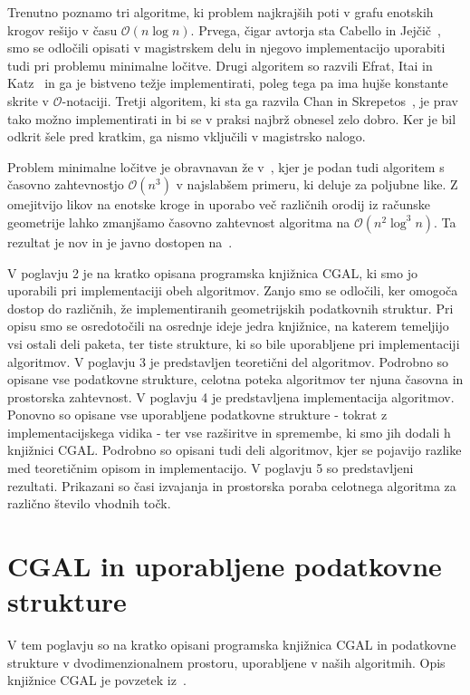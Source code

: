 \documentclass[a4paper, 12pt]{book}
\newcommand{\OO}{\ensuremath{\mathcal{O}}} %
\newcommand{\clearemptydoublepage}{\newpage{\pagestyle{empty}\cleardoublepage}}
\begin{document}
Trenutno poznamo tri algoritme, ki problem najkrajših poti v grafu enotskih krogov rešijo v času $\OO(n\log n)$. Prvega, čigar avtorja sta Cabello in Jejčič~\cite{CJ15}, smo se odločili opisati v magistrskem delu in njegovo implementacijo uporabiti tudi pri problemu minimalne ločitve.
Drugi algoritem so razvili Efrat, Itai in Katz~\cite{eik-01} in ga je bistveno težje implementirati, poleg tega pa ima hujše konstante skrite v \OO -notaciji.
Tretji algoritem, ki sta ga razvila Chan in Skrepetos~\cite{ChanS16}, je prav tako možno implementirati in bi se v praksi najbrž obnesel zelo dobro. Ker je bil odkrit šele pred kratkim, ga nismo vključili v magistrsko nalogo.

Problem minimalne ločitve je obravnavan že v~\cite{CG16}, kjer je podan tudi algoritem s časovno zahtevnostjo $\OO(n^3)$ v najslabšem primeru, ki deluje za poljubne like. Z omejitvijo likov na enotske kroge in uporabo več različnih orodij iz računske geometrije lahko zmanjšamo časovno zahtevnost algoritma na $\OO(n^2\log^3n)$. Ta rezultat je nov in je javno dostopen na~\cite{CM2}.

V poglavju 2 je na kratko opisana programska knjižnica CGAL, ki smo jo uporabili pri implementaciji obeh algoritmov. Zanjo smo se odločili, ker omogoča dostop do različnih, že implementiranih geometrijskih podatkovnih struktur. Pri opisu smo se osredotočili na osrednje ideje jedra knjižnice, na katerem temeljijo vsi ostali deli paketa, ter tiste strukture, ki so bile uporabljene pri implementaciji algoritmov. V poglavju 3 je predstavljen teoretični del algoritmov. Podrobno so opisane vse podatkovne strukture, celotna poteka algoritmov ter njuna časovna in prostorska zahtevnost. V poglavju 4 je predstavljena implementacija algoritmov. Ponovno so opisane vse uporabljene podatkovne strukture - tokrat z implementacijskega vidika - ter vse razširitve in spremembe, ki smo jih dodali h knjižnici CGAL. Podrobno so opisani tudi deli algoritmov, kjer se pojavijo razlike med teoretičnim opisom in implementacijo. V poglavju 5 so predstavljeni rezultati. Prikazani so časi izvajanja in prostorska poraba celotnega algoritma za različno število vhodnih točk.

\clearemptydoublepage


\chapter{CGAL in uporabljene podatkovne strukture}
\label{ch1}

V tem poglavju so na kratko opisani programska knjižnica CGAL in podatkovne strukture v dvodimenzionalnem prostoru, uporabljene v naših algoritmih. Opis knjižnice CGAL je povzetek iz~\cite{cgal:bfghhkps-lgk23-16b}.
\end{document}
